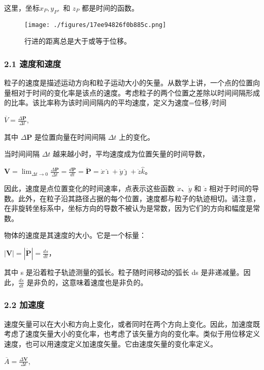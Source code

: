 这里，坐标$x_P, y_P,$ 和 $z_P$ 都是时间的函数。

\begin{figure}[ht]
\centering
\texttt{[image: ./figures/17ee94826f0b885c.png]}
\caption{行进的距离总是大于或等于位移。} \label{fig_YDX_7}
\end{figure}

\subsubsection{2.1 速度和速度}

粒子的速度是描述运动方向和粒子运动大小的矢量。从数学上讲，一个点的位置向量相对于时间的变化率是该点的速度。考虑粒子的两个位置之差除以时间间隔形成的比率。该比率称为该时间间隔内的平均速度，定义为速度=位移/时间

$\overline{V} = \frac{\Delta \mathbf{P}}{\Delta t}$,

其中 $\Delta \mathbf{P}$ 是位置向量在时间间隔 $\Delta t$ 上的变化。

当时间间隔 $\Delta t$ 越来越小时，平均速度成为位置矢量的时间导数，

$\mathbf {V} = \lim_{\Delta t \to 0} \frac{\Delta \mathbf{P}}{\Delta t} = \frac{d \mathbf{P}}{dt} = \dot{\mathbf{P}} = \dot{x}\hat{\imath} + \dot{y}\hat{\jmath} + \dot{z}\hat{k}$。

因此，速度是点位置变化的时间速率，点表示这些函数 $\dot{x}$、$\dot{y}$ 和 $\dot{z}$ 相对于时间的导数。此外，在粒子沿其路径占据的每个位置，速度都与粒子的轨迹相切。请注意，在非旋转坐标系中，坐标方向的导数不被认为是常数，因为它们的方向和幅度是常数。

物体的速度是其速度的大小。它是一个标量：

$\left| \mathbf{V} \right| = \left| \dot{\mathbf{P}} \right| = \frac{ds}{dt}$，

其中 s 是沿着粒子轨迹测量的弧长。粒子随时间移动的弧长 ds 是非递减量。因此，$\frac{ds}{dt}$ 是非负的，这意味着速度也是非负的。

\subsubsection{2.2 加速度}

速度矢量可以在大小和方向上变化，或者同时在两个方向上变化。因此，加速度既考虑了速度矢量大小的变化率，也考虑了该矢量方向的变化率。类似于用位移定义速度，也可以用速度定义加速度矢量。它由速度矢量的变化率定义。

$\overline{A} = \frac{\Delta \mathbf{V}}{\Delta t}$,

